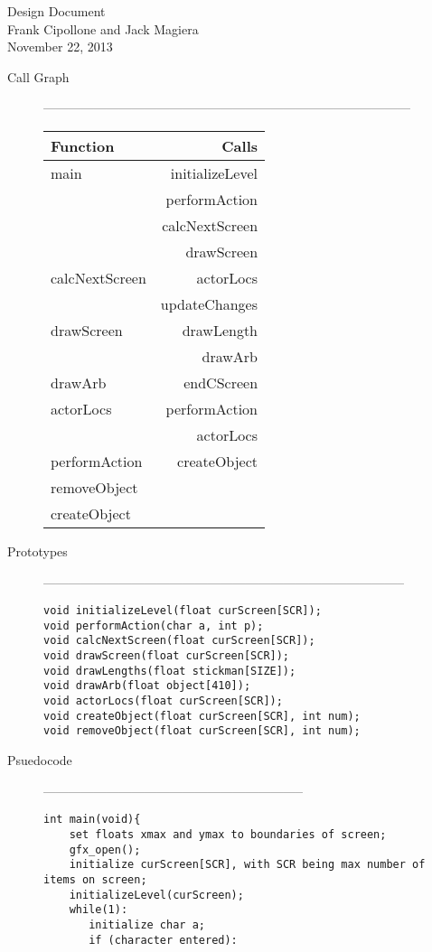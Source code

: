 \documentclass{article}
\begin{document}
Design Document\\
Frank Cipollone and Jack Magiera \\
November 22, 2013 \\
\begin{description}
\item[Call Graph]---------------------------------------------------------------------------------------\\
\begin{tabular}{|l|r|}
\hline
Function & Calls \\
\hline
main & initializeLevel \\
& performAction \\
& calcNextScreen \\
& drawScreen \\
\hline
calcNextScreen & actorLocs\\
& updateChanges \\
\hline
drawScreen & drawLength \\
& drawArb \\
\hline
drawArb & endCScreen \\
\hline
actorLocs & performAction \\
& actorLocs \\
\hline
performAction & createObject \\
\hline
removeObject & \\
\hline
createObject & \\
\hline
\end{tabular}
\item[Prototypes]--------------------------------------------------------------------------------------
\begin{verbatim}
void initializeLevel(float curScreen[SCR]);
void performAction(char a, int p);
void calcNextScreen(float curScreen[SCR]);
void drawScreen(float curScreen[SCR]);
void drawLengths(float stickman[SIZE]);
void drawArb(float object[410]);
void actorLocs(float curScreen[SCR]);
void createObject(float curScreen[SCR], int num);
void removeObject(float curScreen[SCR], int num);
\end{verbatim}
\item[Psuedocode]--------------------------------------------------------------
\begin{verbatim}
int main(void){
    set floats xmax and ymax to boundaries of screen;
    gfx_open();
    initialize curScreen[SCR], with SCR being max number of items on screen;
    initializeLevel(curScreen);
    while(1):
       initialize char a;
       if (character entered):

\end{verbatim}
\end{description}
\end{document}
